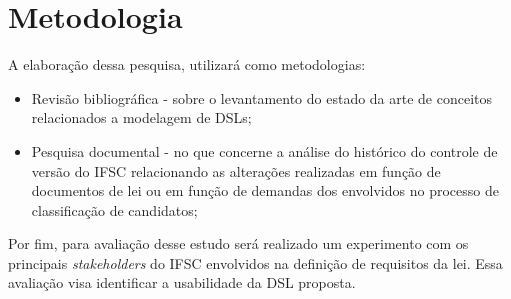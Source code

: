 \section{Metodologia}
\label{metodologia}

A elaboração dessa pesquisa, utilizará como metodologias:

\begin{itemize}
    \item Revisão bibliográfica - sobre o levantamento do estado da arte de conceitos relacionados a modelagem de \gls{DSL}s;
    
    \item Pesquisa documental - no que concerne a análise do histórico do controle de versão do \gls{IFSC} relacionando as alterações realizadas em função de documentos de lei ou em função de demandas dos envolvidos no processo de classificação de candidatos;
    
\end{itemize}

Por fim, para avaliação desse estudo será realizado um experimento com os principais \textit{stakeholders} do IFSC envolvidos na definição de requisitos da lei. Essa avaliação visa identificar a usabilidade da \gls{DSL} proposta.
